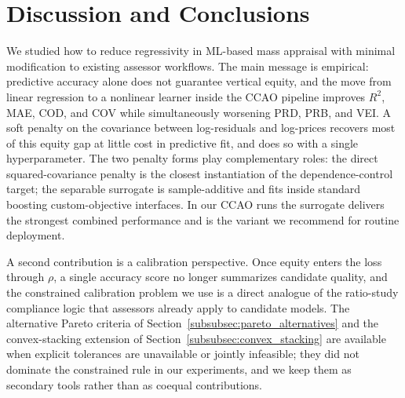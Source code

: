 \documentclass[12pt]{article}
\theoremstyle{plain}
\theoremstyle{definition}
\newcommand{\1}{\mathbf{1}}
\begin{document}







\section{Discussion and Conclusions}
\label{sec:discussion}

We studied how to reduce regressivity in ML-based mass appraisal with minimal modification to existing assessor workflows. The main message is empirical: predictive accuracy alone does not guarantee vertical equity, and the move from linear regression to a nonlinear learner inside the CCAO pipeline improves $R^2$, MAE, COD, and COV while simultaneously worsening PRD, PRB, and VEI. A soft penalty on the covariance between log-residuals and log-prices recovers most of this equity gap at little cost in predictive fit, and does so with a single hyperparameter. The two penalty forms play complementary roles: the direct squared-covariance penalty is the closest instantiation of the dependence-control target; the separable surrogate is sample-additive and fits inside standard boosting custom-objective interfaces. In our CCAO runs the surrogate delivers the strongest combined performance and is the variant we recommend for routine deployment.

A second contribution is a calibration perspective. Once equity enters the loss through $\rho$, a single accuracy score no longer summarizes candidate quality, and the constrained calibration problem we use is a direct analogue of the ratio-study compliance logic that assessors already apply to candidate models. The alternative Pareto criteria of Section~\ref{subsubsec:pareto_alternatives} and the convex-stacking extension of Section~\ref{subsubsec:convex_stacking} are available when explicit tolerances are unavailable or jointly infeasible; they did not dominate the constrained rule in our experiments, and we keep them as secondary tools rather than as coequal contributions.
\end{document}
